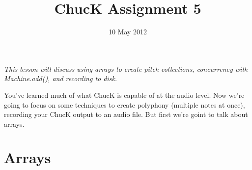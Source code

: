 \documentclass{article}
\title{ChucK Assignment 5}
\date{10 May 2012}
\begin{document}
\maketitle

\textsl{This lesson will discuss using arrays to create pitch collections, concurrency with Machine.add(), and recording to disk.}\vspace{2mm}

You've learned much of what ChucK is capable of at the audio level. Now we're going to focus on some techniques to create polyphony (multiple notes at once), recording your ChucK output to an audio file. But first we're goint to talk about arrays.

\section{Arrays}
\end{document}
